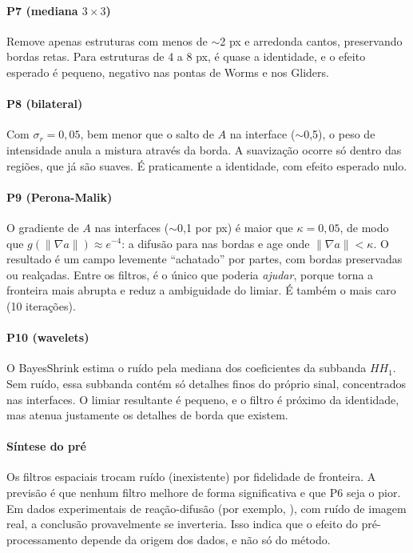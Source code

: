 \paragraph{P7 (mediana $3\times3$)} Remove apenas estruturas com menos de $\sim$2 px e arredonda
cantos, preservando bordas retas. Para estruturas de 4 a 8 px, é quase a identidade, e o efeito
esperado é pequeno, negativo nas pontas de Worms e nos Gliders.

\paragraph{P8 (bilateral)} Com $\sigma_r = 0{,}05$, bem menor que o salto de $A$ na interface
($\sim$0,5), o peso de intensidade anula a mistura através da borda. A suavização ocorre só dentro
das regiões, que já são suaves. É praticamente a identidade, com efeito esperado nulo.

\paragraph{P9 (Perona-Malik)} O gradiente de $A$ nas interfaces ($\sim$0,1 por px) é maior que
$\kappa = 0{,}05$, de modo que $g(\|\nabla a\|)\approx e^{-4}$: a difusão para nas bordas e age
onde $\|\nabla a\|<\kappa$. O resultado é um campo levemente ``achatado'' por partes, com bordas
preservadas ou realçadas. Entre os filtros, é o único que poderia \emph{ajudar}, porque torna a
fronteira mais abrupta e reduz a ambiguidade do limiar. É também o mais caro (10 iterações).

\paragraph{P10 (wavelets)} O BayesShrink estima o ruído pela mediana dos coeficientes da subbanda
$HH_1$. Sem ruído, essa subbanda contém só detalhes finos do próprio sinal, concentrados nas
interfaces. O limiar resultante é pequeno, e o filtro é próximo da identidade, mas atenua
justamente os detalhes de borda que existem.

\paragraph{Síntese do pré} Os filtros espaciais trocam ruído (inexistente) por fidelidade de
fronteira. A previsão é que nenhum filtro melhore de forma significativa e que P6 seja o pior.
 Em dados experimentais de reação-difusão (por exemplo,
\cite{lee1993}), com ruído de imagem real, a conclusão provavelmente se inverteria. Isso indica que
o efeito do pré-processamento depende da origem dos dados, e não só do método.

